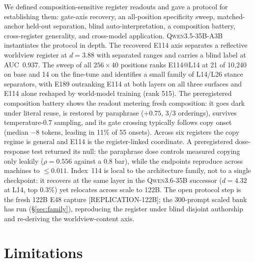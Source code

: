 \documentclass[10pt,a4paper,twocolumn]{article}
\begin{document}
We defined composition-sensitive register readouts and gave a protocol for
establishing them: gate-axis recovery, an all-position specificity sweep,
matched-anchor held-out separation, blind auto-interpretation, a composition
battery, cross-register generality, and cross-model application.
\textsc{Qwen3.5-35B-A3B} instantiates the protocol in depth. The recovered
E114 axis separates a reflective worldview register at $d{=}3.88$ with
separated ranges and carries a blind label at AUC~$0.937$. The sweep of all
$256{\times}40$ positions ranks E114@L14 at 21 of 10{,}240 on base and 14 on
the fine-tune and identifies a small family of L14/L26 stance separators, with
E189 outranking E114 at both layers on all three surfaces and E114 alone
reshaped by world-model training (rank 515). The preregistered composition
battery shows the readout metering fresh composition: it goes dark under
literal reuse, is restored by paraphrase ($+0.75$, 3/3 orderings), survives
temperature-$0.7$ sampling, and its gate crossing typically follows copy
onset (median $-8$ tokens, leading in 11\% of 55 onsets). Across six
registers the copy regime is general and E114 is the register-linked
coordinate. A preregistered dose-response test returned its null: the
paraphrase dose controls measured copying only leakily
($\rho{=}0.556$ against a $0.8$ bar), while the endpoints reproduce across
machines to $\le 0.011$. Index~114 is local to the architecture family, not to
a single checkpoint: it recovers at the same layer in the \textsc{Qwen3.6-35B}
successor ($d{=}4.32$ at L14, top $0.3\%$) yet relocates across scale to 122B.
The open protocol step is the fresh 122B E48 capture [REPLICATION-122B]; the
300-prompt scaled bank has run (\S\ref{sec:family}), reproducing the register
under blind disjoint authorship and re-deriving the worldview-content axis.

\section{Limitations}\label{sec:lim}
\end{document}
